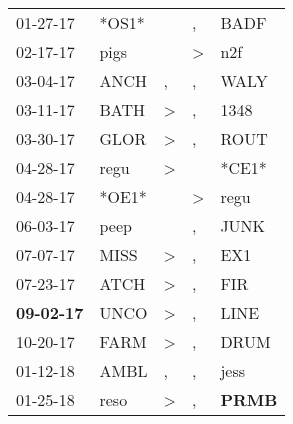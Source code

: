 \begin{supertabular}{p{0.07\textwidth}p{0.06\textwidth}p{0.02\textwidth}p{0.02\textwidth}p{0.06\textwidth}}
          01-27-17\textsuperscript{} &                            *OS1* &                  &                , &           BADF\textsuperscript{} \\
          02-17-17\textsuperscript{} &           pigs\textsuperscript{} &                  &     \textgreater &            n2f\textsuperscript{} \\
          03-04-17\textsuperscript{} &           ANCH\textsuperscript{} &                , &                , &           WALY\textsuperscript{} \\
          03-11-17\textsuperscript{} &           BATH\textsuperscript{} &     \textgreater &                , &           1348\textsuperscript{} \\
          03-30-17\textsuperscript{} &           GLOR\textsuperscript{} &     \textgreater &                , &           ROUT\textsuperscript{} \\
          04-28-17\textsuperscript{} &           regu\textsuperscript{} &     \textgreater &                  &                            *CE1* \\
          04-28-17\textsuperscript{} &                            *OE1* &                  &     \textgreater &           regu\textsuperscript{} \\
          06-03-17\textsuperscript{} &           peep\textsuperscript{} &                  &                , &           JUNK\textsuperscript{} \\
          07-07-17\textsuperscript{} &           MISS\textsuperscript{} &     \textgreater &                , &            EX1\textsuperscript{} \\
          07-23-17\textsuperscript{} &           ATCH\textsuperscript{} &     \textgreater &                , &            FIR\textsuperscript{} \\
 \textbf{09-02-17\textsuperscript{}} &           UNCO\textsuperscript{} &     \textgreater &                , &           LINE\textsuperscript{} \\
          10-20-17\textsuperscript{} &           FARM\textsuperscript{} &     \textgreater &                , &           DRUM\textsuperscript{} \\
          01-12-18\textsuperscript{} &           AMBL\textsuperscript{} &                , &                , &           jess\textsuperscript{} \\
          01-25-18\textsuperscript{} &           reso\textsuperscript{} &     \textgreater &                , &  \textbf{PRMB\textsuperscript{}} \\

\end{supertabular}
